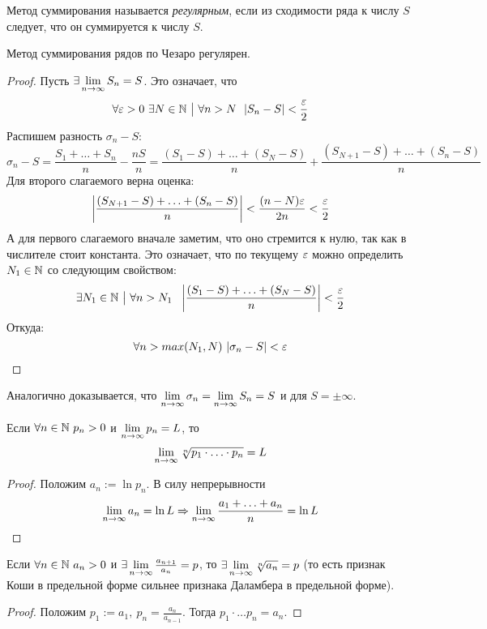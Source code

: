 \begin{definition}
	Метод суммирования называется \textit{регулярным}, если из сходимости ряда к числу $S$ следует, что он суммируется к числу $S$.
\end{definition}

\begin{theorem}
	Метод суммирования рядов по Чезаро регулярен.
\end{theorem}

\begin{proof}
	Пусть $\exists \lim\limits_{n \to \infty} S_n = S$. Это означает, что
	\[
		\forall \varepsilon > 0\ \exists N \in \mathbb{N} \ \big|\  \forall n > N\ \ |S_n - S| < \frac{\varepsilon}{2}
	\]
	Распишем разность $\sigma_n - S$:
	\[
		\sigma_n - S = \frac{S_1 + \ldots + S_n}{n} - \frac{nS}{n} = \frac{(S_1 - S) + \ldots + (S_N - S)}{n} + \frac{(S_{N + 1} - S) + \ldots + (S_n - S)}{n}
	\]
	Для второго слагаемого верна оценка:
	\[
		\left|\frac{(S_{N + 1} - S) + \ldots + (S_n - S)}{n}\right| < \frac{(n - N)\varepsilon}{2n} < \frac{\varepsilon}{2}
	\]
	А для первого слагаемого вначале заметим, что оно стремится к нулю, так как в числителе стоит константа. Это означает, что по текущему $\varepsilon$ можно определить $N_1 \in \mathbb{N}$ со следующим свойством:
	\[
		\exists N_1 \in \N \such \forall n > N_1\ \ \left|\frac{(S_1 - S) + \ldots + (S_N - S)}{n}\right| < \frac{\eps}{2}
	\]
	Откуда:
	\[
		\forall n > max(N_1, N)\ |\sigma_n - S| < \varepsilon
	\]
\end{proof}

\begin{note}
	Аналогично доказывается, что $\lim\limits_{n \to \infty} \sigma_n = \lim\limits_{n \to \infty} S_n = S$ и для $S = \pm \infty$.
\end{note}

\begin{corollary}
	Если $\forall n \in \mathbb{N}\ p_n > 0$ и $\lim\limits_{n \to \infty} p_n = L$, то
	\[
		\lim\limits_{n \to \infty} \sqrt[n]{p_1 \cdot \ldots \cdot p_n} = L
	\]
\end{corollary}

\begin{proof}
	Положим $a_n := \ln p_n$. В силу непрерывности
	\[
		\lim\limits_{n \to \infty} a_n = \ln L \Rightarrow \lim\limits_{n \to \infty} \frac{a_1 + \ldots + a_n}{n} = \ln L
	\]
\end{proof}

\begin{corollary}
	Если $\forall n \in \mathbb{N}\ a_n > 0$ и $\exists \lim\limits_{n \to \infty} \frac{a_{n + 1}}{a_n} = p$, то $\exists \lim\limits_{n \to \infty} \sqrt[n]{a_n} = p$ (то есть признак Коши в предельной форме сильнее признака Даламбера в предельной форме).
\end{corollary}

\begin{proof}
	Положим $p_1 := a_1,\ p_n = \frac{a_n}{a_{n - 1}}$. Тогда $p_1 \cdot \ldots p_n = a_n$.
\end{proof}